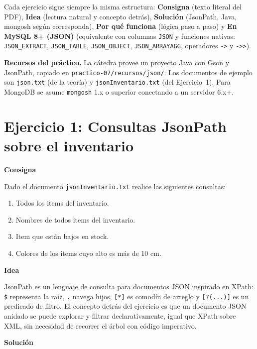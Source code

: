 \documentclass[11pt,a4paper]{article}
\newcommand{\itemcabecera}[1]{\noindent\textbf{#1}\par\medskip}
\newcommand{\bloqueConsigna}{\itemcabecera{Consigna}}
\newcommand{\bloqueIdea}{\itemcabecera{Idea}}
\newcommand{\bloqueSolucion}{\itemcabecera{Soluci\'on}}
\begin{document}
Cada ejercicio sigue siempre la misma estructura: \textbf{Consigna} (texto literal del PDF), \textbf{Idea} (lectura natural y concepto detrás), \textbf{Solución} (JsonPath, Java, mongosh según corresponda), \textbf{Por qué funciona} (lógica paso a paso) y \textbf{En MySQL 8+ (JSON)} (equivalente con columnas \texttt{JSON} y funciones nativas: \texttt{JSON\_EXTRACT}, \texttt{JSON\_TABLE}, \texttt{JSON\_OBJECT}, \texttt{JSON\_ARRAYAGG}, operadores \texttt{->} y \texttt{->>}).

\begin{nota}
\textbf{Recursos del práctico.} La cátedra provee un proyecto Java con Gson y JsonPath, copiado en \texttt{practico-07/recursos/json/}. Los documentos de ejemplo son \texttt{json.txt} (de la teoría) y \texttt{jsonInventario.txt} (del Ejercicio~1). Para MongoDB se asume \texttt{mongosh} 1.x o superior conectando a un servidor 6.x+.
\end{nota}

\section{Ejercicio 1: Consultas JsonPath sobre el inventario}

\bloqueConsigna

Dado el documento \texttt{jsonInventario.txt} realice las siguientes consultas:

\begin{enumerate}[label=\alph*),leftmargin=*]
    \item Todos los items del inventario.
    \item Nombres de todos items del inventario.
    \item Item que están bajos en stock.
    \item Colores de los items cuyo alto es más de 10 cm.
\end{enumerate}

\bloqueIdea

JsonPath es un lenguaje de consulta para documentos JSON inspirado en XPath: \texttt{\$} representa la raíz, \texttt{.} navega hijos, \texttt{[*]} es comodín de arreglo y \texttt{[?(...)]} es un predicado de filtro. El concepto detrás del ejercicio es que un documento JSON anidado se puede explorar y filtrar declarativamente, igual que XPath sobre XML, sin necesidad de recorrer el árbol con código imperativo.

\bloqueSolucion
\end{document}
